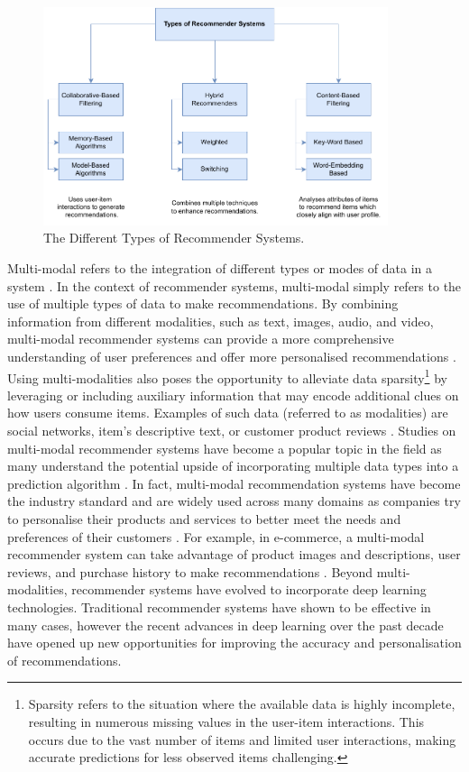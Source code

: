 \begin{figure}[h]
    \centering
    \includegraphics[width=0.9\textwidth]{Figures/recsys.pdf} %
    \caption{The Different Types of Recommender Systems.}
    \label{fig:types_recommenders}
  \end{figure}
  
Multi-modal refers to the integration of different types or modes of data in a system \cite{truong2021multi}. In the context of recommender systems, multi-modal simply refers to the use of multiple types of data to make recommendations. By combining information from different modalities, such as text, images, audio, and video, multi-modal recommender systems can provide a more comprehensive understanding of user preferences and offer more personalised recommendations \cite{truong2021multi}. Using multi-modalities also poses the opportunity to alleviate data sparsity\footnote{Sparsity refers to the situation where the available data is highly incomplete, resulting in numerous missing values in the user-item interactions. This occurs due to the vast number of items and limited user interactions, making accurate predictions for less observed items challenging.} by leveraging or including auxiliary information that may encode additional clues on how users consume items. Examples of such data (referred to as modalities) are social networks, item’s descriptive text, or customer product reviews \cite{truong2021multi}. Studies on multi-modal recommender systems have become a popular topic in the field as many understand the potential upside of incorporating multiple data types into a prediction algorithm \cite{truong2021multi}. In fact, multi-modal recommendation systems have become the industry standard and are widely used across many domains as companies try to personalise their products and services to better meet the needs and preferences of their customers \cite{liu2023multimodal}. For example, in e-commerce, a multi-modal recommender system can take advantage of product images and descriptions, user reviews, and purchase history to make recommendations \cite{liu2023multimodal}. Beyond multi-modalities, recommender systems have evolved to incorporate deep learning technologies. Traditional recommender systems have shown to be effective in many cases, however the recent advances in deep learning over the past decade have opened up new opportunities for improving the accuracy and personalisation of recommendations. 

